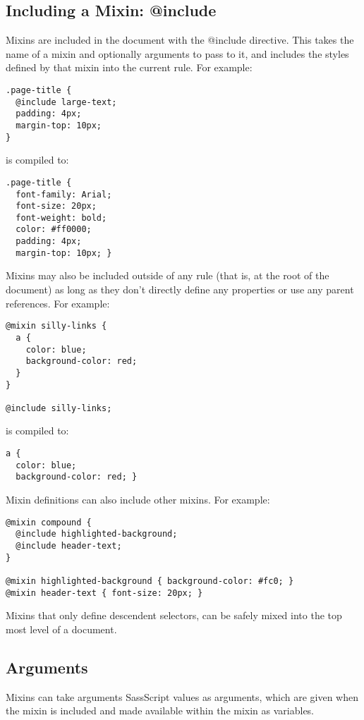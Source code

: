 \documentclass[10pt]{article}
\begin{document}
\subsection{Including a Mixin: @include}


 Mixins are included in the document with the @include directive. This takes the name of a mixin and optionally arguments to pass to it, and includes the styles defined by that mixin into the current rule. For example:
\begin{verbatim}
.page-title {
  @include large-text;
  padding: 4px;
  margin-top: 10px;
}
\end{verbatim}


 is compiled to:
\begin{verbatim}
.page-title {
  font-family: Arial;
  font-size: 20px;
  font-weight: bold;
  color: #ff0000;
  padding: 4px;
  margin-top: 10px; }
\end{verbatim}


 Mixins may also be included outside of any rule (that is, at the root of the document) as long as they don’t directly define any properties or use any parent references. For example:
\begin{verbatim}
@mixin silly-links {
  a {
    color: blue;
    background-color: red;
  }
}

@include silly-links;
\end{verbatim}


 is compiled to:
\begin{verbatim}
a {
  color: blue;
  background-color: red; }
\end{verbatim}


 Mixin definitions can also include other mixins. For example:
\begin{verbatim}
@mixin compound {
  @include highlighted-background;
  @include header-text;
}

@mixin highlighted-background { background-color: #fc0; }
@mixin header-text { font-size: 20px; }
\end{verbatim}


 Mixins that only define descendent selectors, can be safely mixed into the top most level of a document.
\subsection{Arguments}


 Mixins can take arguments SassScript values as arguments, which are given when the mixin is included and made available within the mixin as variables.
\end{document}
